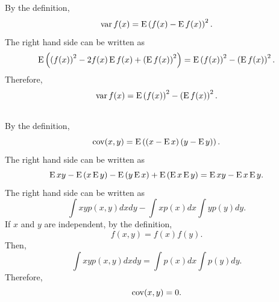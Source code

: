 \subsection{}
\label{1.5}
By the definition, 
%
\begin{equation}
\operatorname{var} f(x) 
= 
\operatorname{E} 
\left( 
	f(x) 
	- 
	\operatorname{E} f(x)
\right) ^ 2.
\end{equation}
%
The right hand side can be written as 
%
\begin{equation}
\operatorname{E} 
\left( 
	\left( 
		f(x) 
	\right) ^ 2 
	- 
	2 
	f(x) 
	\operatorname{E} f(x) 
	+ 
	\left( 
		\operatorname{E} f(x) 
	\right) ^ 2 
\right) 
= 
\operatorname{E} 
\left( 
	f(x) 
\right) ^ 2 
- 
\left( 
	\operatorname{E} f(x) 
\right) ^ 2.
\end{equation}
%
Therefore, 
%
\begin{equation}
\operatorname{var} f(x) 
= 
\operatorname{E} 
\left( 
	f(x) 
\right) ^ 2 
- 
\left( 
	\operatorname{E} f(x) 
\right) ^ 2.
\end{equation}
%


\subsection{}
\label{1.6}
By the definition,
%
\begin{equation}
\operatorname{cov} (x, y) 
= 
\operatorname{E} 
\left( 
	\left( 
		x 
		- 
		\operatorname{E} x 
	\right) 
	\left( 
		y 
		- 
		\operatorname{E} y
	\right) 
\right).
\end{equation}
%
The right hand side can be written as
%
\begin{equation}
\operatorname{E} x y 
- 
\operatorname{E} 
\left( 
	x 
	\operatorname{E} y 
\right) 
- 
\operatorname{E} 
\left( 
	y \operatorname{E} x 
\right) 
+ 
\operatorname{E} 
\left( 
	\operatorname{E} x 
	\operatorname{E} y 
\right) 
= 
\operatorname{E} x y 
- 
\operatorname{E} x 
\operatorname{E} y.
\end{equation}
%
The right hand side can be written as
%
\begin{equation}
\int 
x 
y 
p(x, y) 
dx 
dy 
- 
\int 
x 
p(x) 
dx 
\int 
y 
p(y) 
dy.
\end{equation}
%
If $x$ and $y$ are independent, by the definition,
%
\begin{equation}
f(x, y) 
= 
f(x) 
f(y).
\end{equation}
%
Then,
%
\begin{equation}
\int 
x 
y 
p(x, y) 
dx 
dy 
= 
\int 
p(x) 
dx 
\int 
p(y) 
dy.
\end{equation}
%
Therefore,
%
\begin{equation}
\operatorname{cov} (x, y) 
= 
0.
\end{equation}
%


